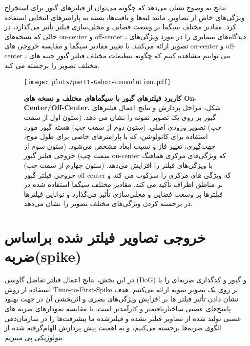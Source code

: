             نتایج به وضوح نشان می‌دهد که چگونه می‌توان از فیلترهای گبور برای استخراج ویژگی‌های خاص از تصاویر، مانند لبه‌ها و بافت‌ها، بسته به پارامترهای انتخابی استفاده کرد. مقادیر مختلف سیگما بر وسعت فضایی و محلی‌سازی فیلتر تأثیر می‌گذارد، در حالی که نسخه‌های 
            on-center
            و 
            off-center
            ، دیدگاه‌های متمایزی را در مورد ویژگی‌های تصویر ارائه می‌کنند. با تغییر مقادیر سیگما و مقایسه خروجی های 
            on-center
            و 
            off-center
            ، می توانیم مشاهده کنیم که چگونه تنظیمات مختلف فیلتر گبور جنبه های مختلف تصویر را برجسته می کند.
            \begin{figure}[!ht]
                \centering
                \texttt{[image: plots/part1-Gabor-convolution.pdf]} 
                \captionsetup{width=.8\linewidth}
                \caption{\textbf{کاربرد فیلترهای گبور با سیگماهای مختلف و نسخه های On-Center/Off-Center.} 
                شکل، مراحل پردازش و نتایج اعمال فیلترهای گبور بر روی یک تصویر نمونه را نشان می دهد. 
                (ستون اول از سمت چپ) 
                تصویر ورودی اصلی. 
                (ستون دوم از سمت چپ) 
                هسته گبور مورد استفاده برای کانولوشن، که با پارامترهای خاصی برای طول موج، جهت‌گیری، تغییر فاز و نسبت ابعاد مشخص می‌شود. 
                (ستون سوم از سمت چپ) 
                خروجی فیلتر گبور 
                on-center
                که ویژگی‌های مرکزی هماهنگ با ویژگی‌های فیلتر را افزایش می‌دهد. 
                (ستون چهارم از سمت چپ) 
                خروجی فیلتر گبور 
                off-center
                که ویژگی های مرکزی را سرکوب می کند و بر مناطق اطراف تأکید می کند. مقادیر مختلف سیگما استفاده شده در فیلترها بر وسعت فضایی و محلی‌سازی تأثیر می‌گذارد و توانایی فیلترها در برجسته کردن ویژگی‌های مختلف تصویر را نشان می‌دهد.}
                \label{fig:part1-Gabor-convolution}
            \end{figure}

    \clearpage
    \section{خروجی تصاویر فیلتر شده براساس ضربه(spike)}
        در این بخش، نتایج اعمال فیلتر تفاضل گاوسی 
        (DoG) 
        و گبور و کدگذاری ضربه‌ای را با استفاده از روش 
        Time-to-First-Spike
        بر روی یک تصویر نمونه ارائه می‌کنیم. هدف نشان دادن تأثیر فیلتر ها 
        بر افزایش ویژگی‌های بصری و اثربخشی آن در جهت بهبود پاسخ‌های عصبی ساختاریافته‌تر و کارآمدتر است. با مقایسه نمودارهای ضربه های عصبی تولید شده از تصاویر فیلتر نشده و فیلترشده 
        ما پیشرفت‌ها را در 
        سازمان‌دهی الگوی ضربه‌ها برجسته می‌کنیم، و به اهمیت پیش پردازش الهام‌گرفته شده از بیولوژیکی پی میبریم.

